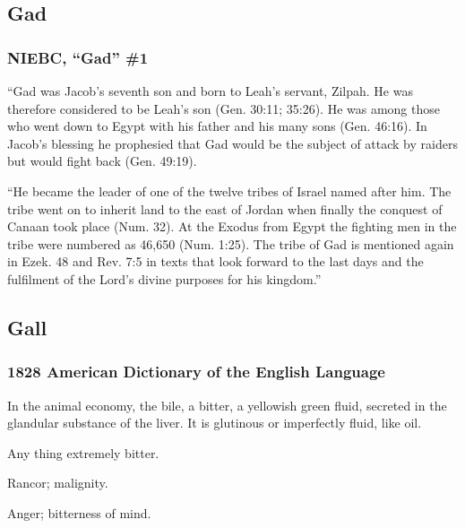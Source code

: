 
	\subsection{Gad} %
		\label{GAD}
		
		\subsubsection{NIEBC, ``Gad'' \#1}
		
			``Gad was Jacob's seventh son and born to Leah's servant, Zilpah. He was therefore considered to be Leah's son (Gen. 30:11; 35:26). He was among those who went down to Egypt with his father and his many sons (Gen. 46:16). In Jacob's blessing he prophesied that Gad would be the subject of attack by raiders but would fight back (Gen. 49:19).
			
			``He became the leader of one of the twelve tribes of Israel named after him. The tribe went on to inherit land to the east of Jordan when finally the conquest of Canaan took place (Num. 32). At the Exodus from Egypt the fighting men in the tribe were numbered as 46,650 (Num. 1:25). The tribe of Gad is mentioned again in Ezek. 48 and Rev. 7:5 in texts that look forward to the last days and the fulfilment of the Lord's divine purposes for his kingdom.''
			
	\subsection{Gall} %
		\label{GALL}
		
		\subsubsection{1828 American Dictionary of the English Language}
		
			\begin{compactitem}
				\item[1] In the animal economy, the bile, a bitter, a yellowish green fluid, secreted in the glandular substance of the liver. It is glutinous or imperfectly fluid, like oil.
				\item[2] Any thing extremely bitter.
				\item[3] Rancor; malignity.
				\item[4] Anger; bitterness of mind.
			\end{compactitem}
			
